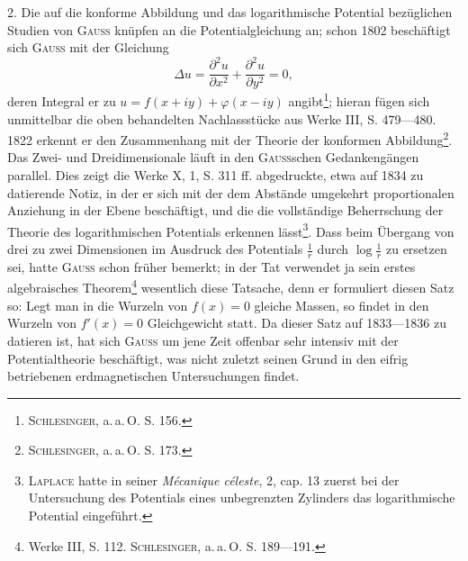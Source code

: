 2. Die auf die konforme Abbildung und das logarithmische Potential
bezüglichen Studien von \textsc{Gauss} knüpfen an die Potentialgleichung an; schon
1802 beschäftigt sich \textsc{Gauss} mit der Gleichung
\[
\Delta u=\frac{\partial^2u}{\partial x^2}+\frac{\partial^2u}{\partial y^2}=0,
\]
\noindent deren Integral er zu \(u=f(x+iy)+\varphi(x-iy)\) angibt\footnote{\textsc{Schlesinger}, a.\,a.\,O. S. 156.}; hieran fügen sich unmittelbar
die oben behandelten Nachlassstücke aus Werke III, S. 479—480.
1822 erkennt er den Zusammenhang mit der Theorie der konformen Abbildung\footnote{\textsc{Schlesinger}, a.\,a.\,O. S. 173.}.
Das Zwei- und Dreidimensionale läuft in den \textsc{Gauss}schen Gedankengängen
parallel. Dies zeigt die Werke X, 1, S. 311 ff. abgedruckte,
etwa auf 1834 zu datierende Notiz, in der er sich mit der dem Abstände
umgekehrt proportionalen Anziehung in der Ebene beschäftigt, und die die
vollständige Beherrschung der Theorie des logarithmischen Potentials erkennen
lässt\footnote{\textsc{Laplace} hatte in seiner \textit{Mécanique céleste}, 2, cap. 13 zuerst bei der Untersuchung des Potentials eines unbegrenzten Zylinders das logarithmische Potential eingeführt.}. Dass beim Übergang von drei zu zwei Dimensionen im Ausdruck
des Potentials \(\frac1r\) durch \(\log\frac1r\) zu ersetzen sei, hatte \textsc{Gauss} schon früher
\clearpage{}
\noindent bemerkt; in der Tat verwendet ja sein erstes algebraisches Theorem\footnote{Werke III, S. 112. \textsc{Schlesinger}, a.\,a.\,O. S. 189—191.} wesentlich
diese Tatsache, denn er formuliert diesen Satz so: Legt man in die
Wurzeln von \(f(x)=0\) gleiche Massen, so findet in den Wurzeln von \(f'(x)=0\)
Gleichgewicht statt. Da dieser Satz auf 1833—1836 zu datieren ist, hat sich
\textsc{Gauss} um jene Zeit offenbar sehr intensiv mit der Potentialtheorie beschäftigt,
was nicht zuletzt seinen Grund in den eifrig betriebenen erdmagnetischen
Untersuchungen findet.

